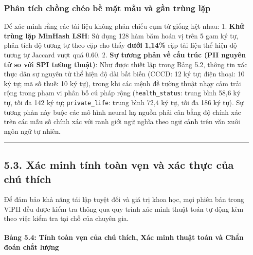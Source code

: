 \documentclass[
  11pt,
  a4paper,
]{article}
\begin{document}
\subsubsection{Phân tích chồng chéo bề mặt mẫu và gần trùng
lặp}\label{phuxe2n-tuxedch-chux1ed3ng-chuxe9o-bux1ec1-mux1eb7t-mux1eabu-vuxe0-gux1ea7n-truxf9ng-lux1eb7p}

Để xác minh rằng các tài liệu không phản chiếu cụm từ giống hệt nhau: 1.
\textbf{Khử trùng lặp MinHash LSH}: Sử dụng 128 hàm băm hoán vị trên 5
gam ký tự, phân tích độ tương tự theo cặp cho thấy \textbf{dưới 1,14\%}
cặp tài liệu thể hiện độ tương tự Jaccard vượt quá \(0.60\). 2.
\textbf{Sự tương phản về cấu trúc (PII nguyên tử so với SPI tường
thuật)}: Như được thiết lập trong Bảng 5.2, thông tin xác thực dân sự
nguyên tử thể hiện độ dài bất biến (CCCD: 12 ký tự; điện thoại: 10 ký
tự; mã số thuế: 10 ký tự), trong khi các mệnh đề tường thuật nhạy cảm
trải rộng trong phạm vi phân bố cú pháp rộng (\texttt{health\_status}:
trung bình 58,6 ký tự, tối đa 142 ký tự; \texttt{private\_life}: trung
bình 72,4 ký tự, tối đa 186 ký tự). Sự tương phản này buộc các mô hình
neural hạ nguồn phải cân bằng độ chính xác trên các mẫu số chính xác với
ranh giới ngữ nghĩa theo ngữ cảnh trên văn xuôi ngôn ngữ tự nhiên.

\begin{center}\rule{0.5\linewidth}{0.5pt}\end{center}

\subsection{5.3. Xác minh tính toàn vẹn và xác thực của chú
thích}\label{xuxe1c-minh-tuxednh-touxe0n-vux1eb9n-vuxe0-xuxe1c-thux1ef1c-cux1ee7a-chuxfa-thuxedch}

Để đảm bảo khả năng tái lập tuyệt đối và giá trị khoa học, mọi phiên bản
trong ViPII đều được kiểm tra thông qua quy trình xác minh thuật toán tự
động kèm theo việc kiểm tra tại chỗ của chuyên gia.

\paragraph{Bảng 5.4: Tính toàn vẹn của chú thích, Xác minh thuật toán và
Chẩn đoán chất
lượng}\label{bux1ea3ng-5.4-tuxednh-touxe0n-vux1eb9n-cux1ee7a-chuxfa-thuxedch-xuxe1c-minh-thuux1eadt-touxe1n-vuxe0-chux1ea9n-ux111ouxe1n-chux1ea5t-lux1b0ux1ee3ng}
\end{document}
